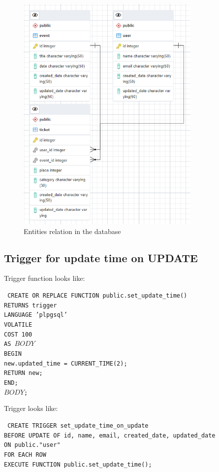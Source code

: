 \begin{figure}[h]
    \centering
    \includegraphics[width=0.8\textwidth]{images/database_relations}
    \caption{Entities relation in the database}
    \label{fig:db_relations}
\end{figure}

\subsection{Trigger for update time on UPDATE}\label{subsec:trigger}

Trigger function looks like:

\texttt{
    CREATE OR REPLACE FUNCTION public.set_update_time() \\
    RETURNS trigger \\
    LANGUAGE 'plpgsql' \\
    VOLATILE \\
    COST 100 \\
    AS $BODY$ \\
    BEGIN \\
    new.updated\_time = CURRENT\_TIME(2); \\
    RETURN new; \\
    END; \\
    $BODY$; \\
}

Trigger looks like:

\texttt{
    CREATE TRIGGER set\_update\_time\_on\_update \\
    BEFORE UPDATE OF id, name, email, created\_date, updated\_date \\
    ON public."user" \\
    FOR EACH ROW \\
    EXECUTE FUNCTION public.set\_update\_time(); \\
}

